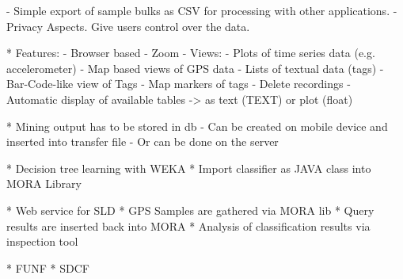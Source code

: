 \documentclass[times, 10pt,twocolumn]{article}
\begin{document}
  - Simple export of sample bulks as CSV for processing with other applications.
  - Privacy Aspects. Give users control over the data.

* Features:
  - Browser based
  - Zoom
  - Views:
    - Plots of time series data (e.g. accelerometer)
    - Map based views of GPS data
    - Lists of textual data (tags)
    - Bar-Code-like view of Tags
    - Map markers of tags
  - Delete recordings
  - Automatic display of available tables
    -> as text (TEXT) or plot (float)

* Mining output has to be stored in db
  - Can be created on mobile device and inserted into transfer file
  - Or can be done on the server


* Decision tree learning with WEKA
* Import classifier as JAVA class into MORA Library

* Web service for SLD
* GPS Samples are gathered via MORA lib
* Query results are inserted back into MORA
* Analysis of classification results via inspection tool


* FUNF
* SDCF


\nocite{ex1,ex2}


\end{document}
